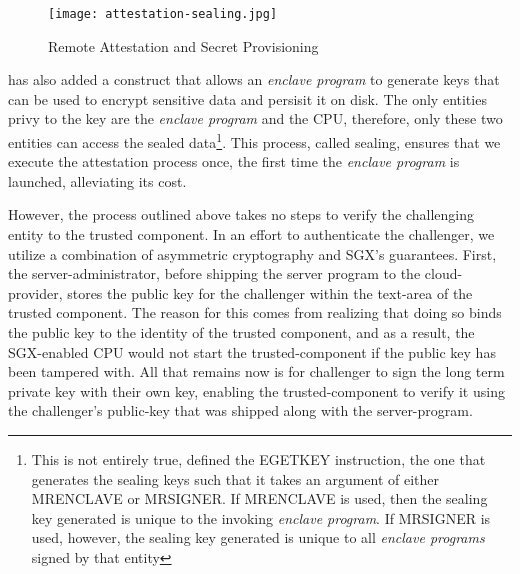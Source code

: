 \documentclass[../main.tex]{subfiles}
\begin{document}
\begin{figure}[H]
  \centering
  \texttt{[image: attestation-sealing.jpg]}
  \caption{Remote Attestation and Secret Provisioning}
  \label{fig:attest}
\end{figure}

\Intel has also added a construct that allows an \textit{enclave
program} to generate keys that can be used to encrypt sensitive data
and persisit it on disk. The only entities privy to the key are the
\textit{enclave program} and the CPU, therefore, only these two
entities can access the sealed data\footnote{This is not entirely
true, \Intel defined the EGETKEY instruction, the one that generates
the sealing keys such that it takes an argument of either MRENCLAVE or
MRSIGNER. If MRENCLAVE is used, then the sealing key generated is
unique to the invoking \textit{enclave program}. If MRSIGNER is used,
however, the sealing key generated is unique to all \textit{enclave
programs} signed by that entity}. This process, called sealing,
ensures that we execute the attestation process once, the first time
the \textit{enclave program} is launched, alleviating its cost.

However, the process outlined above takes no steps to verify the
challenging entity to the trusted component. In an effort to
authenticate the challenger, we utilize a combination of asymmetric
cryptography and SGX's guarantees.
First, the server-administrator, before shipping the server program to
the cloud-provider, stores the public key for the challenger within
the text-area of the trusted component. The reason for this comes from
realizing that doing so binds the public key to the identity of the
trusted component, and as a result, the SGX-enabled CPU would not
start the trusted-component if the public key has been tampered
with. All that remains now is for challenger to sign the long term
private key with their own key, enabling the trusted-component to
verify it using the challenger's public-key that was shipped along
with the server-program.
\end{document}
